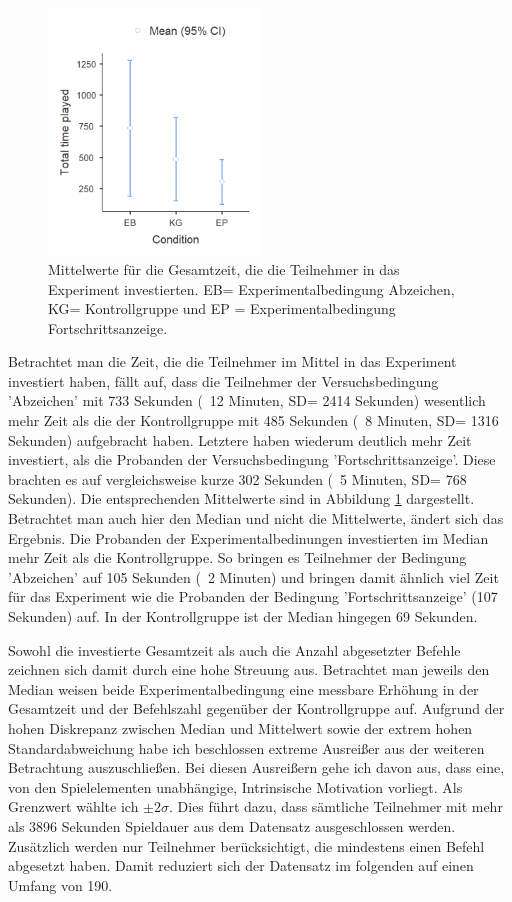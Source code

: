 \begin{figure}[htbp]
    \centering
    \includegraphics[width=0.5\textwidth]{img/auswertung/mean_time.png}
    \caption{Mittelwerte für die Gesamtzeit, die die Teilnehmer in das Experiment investierten. EB= Experimentalbedingung Abzeichen, KG= Kontrollgruppe und EP = Experimentalbedingung Fortschrittsanzeige.}
    \label{mean_time}
\end{figure}
Betrachtet man die Zeit, die die Teilnehmer im Mittel in das Experiment investiert haben, fällt auf, dass die Teilnehmer der Versuchsbedingung 'Abzeichen' mit 733 Sekunden (~12 Minuten, SD= 2414 Sekunden) wesentlich mehr Zeit als die der Kontrollgruppe mit 485 Sekunden (~8 Minuten, SD= 1316 Sekunden) aufgebracht haben. Letztere haben wiederum deutlich mehr Zeit investiert, als die Probanden der Versuchsbedingung 'Fortschrittsanzeige'. Diese brachten es auf vergleichsweise kurze 302 Sekunden (~5 Minuten, SD= 768 Sekunden). Die entsprechenden Mittelwerte sind in Abbildung \ref{mean_time} dargestellt. Betrachtet man auch hier den Median und nicht die Mittelwerte, ändert sich das Ergebnis. Die Probanden der Experimentalbedinungen investierten im Median mehr Zeit als die Kontrollgruppe. So bringen es Teilnehmer der Bedingung 'Abzeichen' auf 105 Sekunden (~2 Minuten) und bringen damit ähnlich viel Zeit für das Experiment wie die Probanden der Bedingung 'Fortschrittsanzeige' (107 Sekunden) auf. In der Kontrollgruppe ist der Median hingegen 69 Sekunden.

Sowohl die investierte Gesamtzeit als auch die Anzahl abgesetzter Befehle zeichnen sich damit durch eine hohe Streuung aus. Betrachtet man jeweils den Median weisen beide Experimentalbedingung eine messbare Erhöhung in der Gesamtzeit und der Befehlszahl gegenüber der Kontrollgruppe auf. Aufgrund der hohen Diskrepanz zwischen Median und Mittelwert sowie der extrem hohen Standardabweichung habe ich beschlossen extreme Ausreißer aus der weiteren Betrachtung auszuschließen. Bei diesen Ausreißern gehe ich davon aus, dass eine, von den Spielelementen unabhängige, Intrinsische Motivation vorliegt. Als Grenzwert wählte ich $\pm 2\sigma$. Dies führt dazu, dass sämtliche Teilnehmer mit mehr als 3896 Sekunden Spieldauer aus dem Datensatz ausgeschlossen werden. Zusätzlich werden nur Teilnehmer berücksichtigt, die mindestens einen Befehl abgesetzt haben. Damit reduziert sich der Datensatz im folgenden auf einen Umfang von 190.

